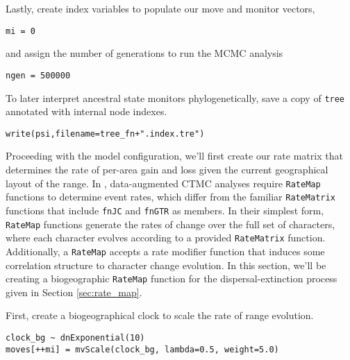 Lastly, create index variables to populate our move and monitor vectors,

\begin{snugshade}
\begin{lstlisting}
mi = 0
\end{lstlisting}
\end{snugshade}

and assign the number of generations to run the MCMC analysis

\begin{snugshade}
\begin{lstlisting}
ngen = 500000
\end{lstlisting}
\end{snugshade}

To later interpret ancestral state monitors phylogenetically, save a copy of {\tt tree} annotated with internal node indexes.

\begin{snugshade}
\begin{lstlisting}
write(psi,filename=tree_fn+".index.tre")
\end{lstlisting}
\end{snugshade}

Proceeding with the model configuration, we'll first create our rate matrix that determines the rate of per-area gain and loss given the current geographical layout of the range.
In \RevBayes, data-augmented CTMC analyses require {\tt RateMap} functions to determine event rates, which differ from the familiar {\tt RateMatrix} functions that include {\tt fnJC} and {\tt fnGTR} as members.
In their simplest form, {\tt RateMap} functions generate the rates of change over the full set of characters, where each character evolves according to a provided {\tt RateMatrix} function.
Additionally, a {\tt RateMap} accepts a rate modifier function that induces some correlation structure to character change evolution.
In this section, we'll be creating a biogeographic {\tt RateMap} function for the dispersal-extinction process given in Section \ref{sec:rate_map}.

First, create a biogeographical clock to scale the rate of range evolution.

\begin{snugshade}
\begin{lstlisting}
clock_bg ~ dnExponential(10)
moves[++mi] = mvScale(clock_bg, lambda=0.5, weight=5.0)
\end{lstlisting}
\end{snugshade}

